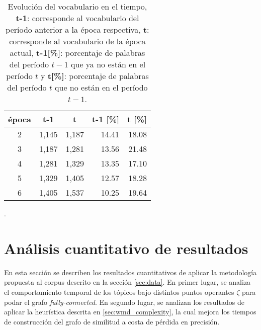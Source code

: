 \begin{table}[H]
    \begin{tabular}{|c|r|r|r|r|}
    \hline
    \textbf{época} & \multicolumn{1}{c|}{\textbf{t-1}} & \multicolumn{1}{c|}{\textbf{t}} & \multicolumn{1}{c|}{\textbf{t-1 {[}\%{]}}} & \multicolumn{1}{l|}{\textbf{t {[}\%{]}}} \\ \hline
    2              & 1,145                              & 1,187                            & 14.41                                      & 18.08                                    \\ \hline
    3              & 1,187                              & 1,281                            & 13.56                                      & 21.48                                    \\ \hline
    4              & 1,281                              & 1,329                            & 13.35                                      & 17.10                                    \\ \hline
    5              & 1,329                              & 1,405                            & 12.57                                      & 18.28                                    \\ \hline
    6              & 1,405                              & 1,537                            & 10.25                                      & 19.64                                    \\ \hline
    \end{tabular}
    \caption{Evolución del vocabulario en el tiempo, \textbf{t-1}: corresponde al vocabulario del período anterior a la época respectiva, \textbf{t}: corresponde al vocabulario de la época actual, \textbf{t-1[\%]}: porcentaje de palabras del período $t-1$ que ya no están en el período $t$ y \textbf{t[\%]}: porcentaje de palabras del período $t$ que no están en el período $t-1$.}
    \label{table:innovation_rate}.
\end{table}


\section{Análisis cuantitativo de resultados}
\label{sec:quantative}

En esta sección se describen los resultados cuantitativos de aplicar la metodología propuesta al corpus descrito en la sección \ref{sec:data}. En primer lugar, se analiza el comportamiento temporal de los tópicos bajo distintos puntos operantes $\zeta$ para podar el grafo \textit{fully-connected}. En segundo lugar, se analizan los resultados de aplicar la heurística descrita en \ref{sec:wmd_complexity}, la cual mejora los tiempos de construcción del grafo de similitud a costa de pérdida en precisión.

